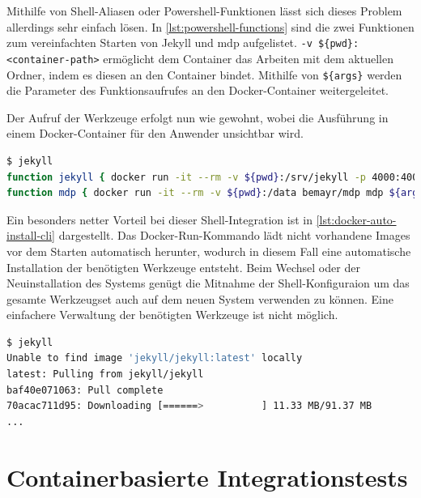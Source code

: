 Mithilfe von Shell-Aliasen oder Powershell-Funktionen lässt sich dieses Problem allerdings sehr einfach lösen.
In \cref{lst:powershell-functions} sind die zwei Funktionen zum vereinfachten Starten von Jekyll und mdp aufgelistet.
\texttt{-v \$\{pwd\}:<container-path>} ermöglicht dem Container das Arbeiten mit dem aktuellen Ordner, indem es diesen an den Container bindet.
Mithilfe von \texttt{\$\{args\}} werden die Parameter des Funktionsaufrufes an den Docker-Container weitergeleitet.

Der Aufruf der Werkzeuge erfolgt nun wie gewohnt, wobei die Ausführung in einem Docker-Container für den Anwender unsichtbar wird.

\begin{lstlisting}[caption=Powershell-Funktionen für Docker-Kommandos, language=bash, label=lst:powershell-functions]
$ jekyll
function jekyll { docker run -it --rm -v ${pwd}:/srv/jekyll -p 4000:4000 jekyll/jekyll /usr/local/bin/jekyll ${args} }
function mdp { docker run -it --rm -v ${pwd}:/data bemayr/mdp mdp ${args} }
\end{lstlisting}
Ein besonders netter Vorteil bei dieser Shell-Integration ist in \cref{lst:docker-auto-install-cli} dargestellt.
Das Docker-Run-Kommando lädt nicht vorhandene Images vor dem Starten automatisch herunter, wodurch in diesem Fall eine automatische Installation der benötigten Werkzeuge entsteht.
Beim Wechsel oder der Neuinstallation des Systems genügt die Mitnahme der Shell-Konfiguraion um das gesamte Werkzeugset auch auf dem neuen System verwenden zu können.
Eine einfachere Verwaltung der benötigten Werkzeuge ist nicht möglich.

\begin{lstlisting}[caption=Automatische Installation der Docker-basierten CLI-Anwendungen, language=bash, label=lst:docker-auto-install-cli]
$ jekyll
Unable to find image 'jekyll/jekyll:latest' locally
latest: Pulling from jekyll/jekyll
baf40e071063: Pull complete
70acac711d95: Downloading [======>          ] 11.33 MB/91.37 MB
...
\end{lstlisting}


\section{Containerbasierte Integrationstests}
\label{sec:containerbasiertes-integrationstests}

